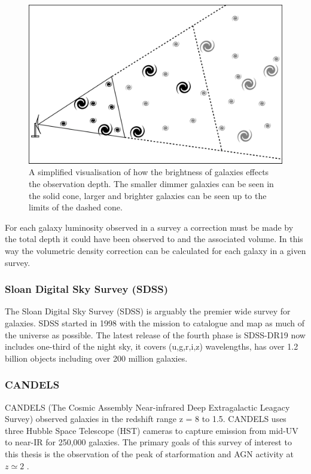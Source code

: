 \begin{figure}[h]
    \centering
    \includegraphics[width = \linewidth]{Figures/Chapter1/Vmax_Toon.png}
    \caption{A simplified visualisation of how the brightness of galaxies effects the observation depth. The smaller dimmer galaxies can be seen in the solid cone, larger and brighter galaxies can be seen up to the limits of the dashed cone.}
    \label{fig:Vmax}
\end{figure}

For each galaxy luminosity observed in a survey a correction must be made by the total depth it could have been observed to and the associated volume. In this way the volumetric density correction can be calculated for each galaxy in a given survey.

\subsubsection{Sloan Digital Sky Survey (SDSS)}

The Sloan Digital Sky Survey (SDSS) is arguably the premier wide survey for galaxies. SDSS started in 1998 with the mission to catalogue and map as much of the universe as possible. The latest release of the fourth phase is SDSS-DR19 \citep{Ahumada2019TheSpectra} now includes one-third of the night sky, it covers (u,g,r,i,z) wavelengths, has over 1.2 billion objects including over 200 million galaxies.

\subsubsection{CANDELS}
CANDELS (The Cosmic Assembly Near-infrared Deep Extragalactic Leagacy Survey) observed galaxies in the redshift range z = 8 to 1.5. CANDELS uses three Hubble Space Telescope (HST) cameras to capture emission from mid-UV to near-IR for 250,000 galaxies. The primary goals of this survey of interest to this thesis is the observation of the peak of starformation and AGN activity at $z \simeq 2$ \cite{Grogin2011Candels:Survey}.

